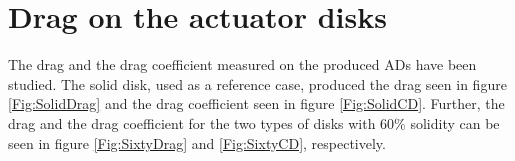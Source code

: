 \section{Drag on the actuator disks}

The drag and the drag coefficient measured on the produced \gls{AD}s have been studied. The solid disk, used as a reference case, produced the drag seen in figure \ref{Fig:SolidDrag} and the drag coefficient seen in figure \ref{Fig:SolidCD}. Further, the drag and the drag coefficient for the two types of disks with 60\% solidity can be seen in figure \ref{Fig:SixtyDrag} and \ref{Fig:SixtyCD}, respectively. 




